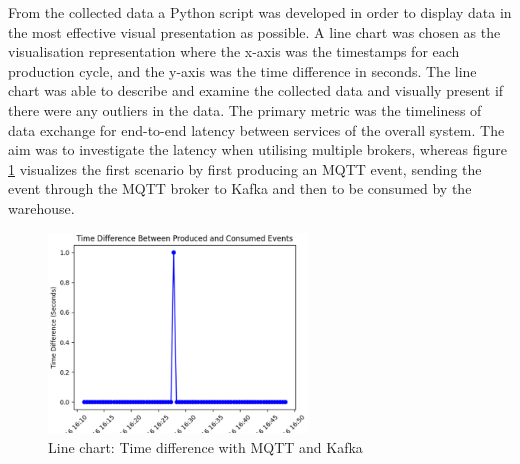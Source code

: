 From the collected data a Python script was developed in order to display data in the most effective visual presentation as possible. A line chart was chosen as the visualisation representation where the x-axis was the timestamps for each production cycle, and the y-axis was the time difference in seconds. The line chart was able to describe and examine the collected data and visually present if there were any outliers in the data.
The primary metric was the timeliness of data exchange for end-to-end latency between services of the overall system. The aim was to investigate the latency when utilising multiple brokers, whereas figure \ref{fig:linechart1} visualizes the first scenario by first producing an MQTT event, sending the event through the MQTT broker to Kafka and then to be consumed by the warehouse.
\begin{figure}[h]
    \includegraphics[width=195pt]{images/linechart1.png}
    \centering
    \caption{Line chart: Time difference with MQTT and Kafka}
    \label{fig:linechart1}
\end{figure}

